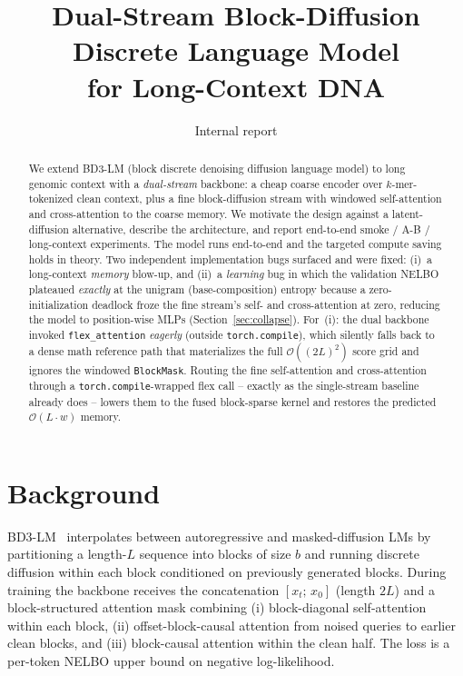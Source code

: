 \documentclass[11pt,a4paper]{article}
\title{Dual-Stream Block-Diffusion Discrete Language Model \\
       for Long-Context DNA}
\author{Internal report}
\date{}
\begin{document}
\maketitle

\begin{abstract}
We extend BD3-LM (block discrete denoising diffusion language model) to long
genomic context with a \emph{dual-stream} backbone: a cheap coarse encoder over
\(k\)-mer-tokenized clean context, plus a fine block-diffusion stream with
windowed self-attention and cross-attention to the coarse memory. We motivate
the design against a latent-diffusion alternative, describe the architecture,
and report end-to-end smoke / A-B / long-context experiments. The model runs
end-to-end and the targeted compute saving holds in theory. Two independent
implementation bugs surfaced and were fixed: (i)~a long-context \emph{memory}
blow-up, and (ii)~a \emph{learning} bug in which the validation NELBO plateaued
\emph{exactly} at the unigram (base-composition) entropy because a
zero-initialization deadlock froze the fine stream's self- and cross-attention at
zero, reducing the model to position-wise MLPs (Section~\ref{sec:collapse}).
For~(i): the dual backbone invoked \texttt{flex\_attention}
\emph{eagerly} (outside \texttt{torch.compile}), which silently falls back to a
dense math reference path that materializes the full \(\mathcal{O}((2L)^2)\)
score grid and ignores the windowed \texttt{BlockMask}. Routing the fine
self-attention and cross-attention through a \texttt{torch.compile}-wrapped flex
call -- exactly as the single-stream baseline already does -- lowers them to the
fused block-sparse kernel and restores the predicted
\(\mathcal{O}(L\!\cdot\!w)\) memory.
\end{abstract}

\section{Background}

BD3-LM~\cite{bd3lm} interpolates between autoregressive and masked-diffusion
LMs by partitioning a length-\(L\) sequence into blocks of size \(b\) and
running discrete diffusion within each block conditioned on previously
generated blocks. During training the backbone receives the concatenation
\([x_t;\,x_0]\) (length \(2L\)) and a block-structured attention mask
combining (i) block-diagonal self-attention within each block, (ii)
offset-block-causal attention from noised queries to earlier clean blocks, and
(iii) block-causal attention within the clean half. The loss is a per-token
NELBO upper bound on negative log-likelihood.
\end{document}
